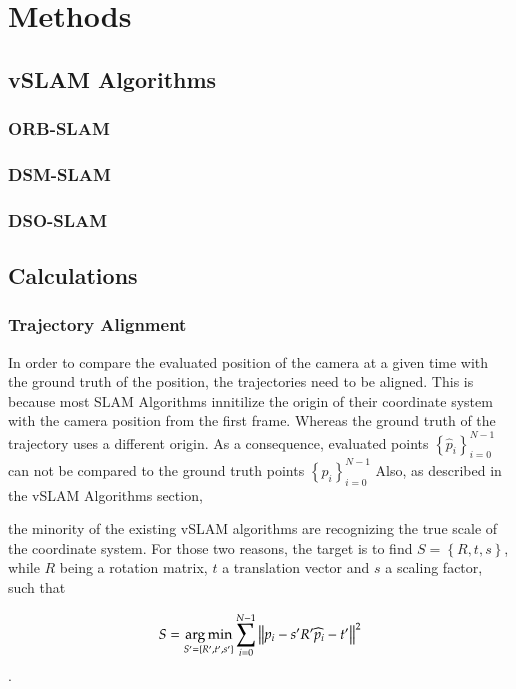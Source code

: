 \chapter{Methods}
\section{vSLAM Algorithms}

	\subsection{ORB-SLAM}

	\subsection{DSM-SLAM}

	\subsection{DSO-SLAM}

\section{Calculations}

	\subsection{Trajectory Alignment}
	
	In order to compare the evaluated position of the camera at a given time with the ground truth of the 
	position, the trajectories need to be aligned. This is because most SLAM Algorithms innitilize the origin
	of their coordinate system with the camera position from the first frame. Whereas the ground truth of the 
	trajectory uses a different origin. As a consequence, evaluated points $ \left\{{\widehat{p}_i}\right\}_{i=0}^{N-1} $ can not be 
	compared to the ground truth points $ \left\{{p_i}\right\}_{i=0}^{N-1} $
	Also, as described in the vSLAM Algorithms section,
	
	
	the minority of the existing vSLAM algorithms are recognizing the true scale of the coordinate system. For
	those two reasons, the target is to find $S = \left\{R,t,s\right\}$, while $R$ being a rotation matrix, $t$ a translation vector
	and $s$ a scaling factor, 
	such that
	
	$$ S = \mathop{\mathrm{arg\,min}}_{S' = \left\{R', t', s' \right\}} \sum_{i = 0}^{N-1} \left\lVert p_i - s'R'\widehat{p}_i - t'\right\rVert^2 $$ .
	
